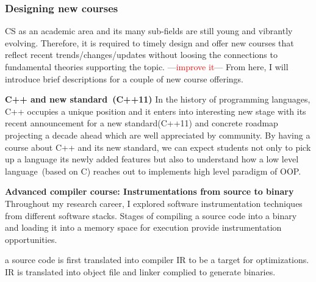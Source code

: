\documentclass[letterpaper, 10pt]{article}
\newcommand{\jikk}[1]{{---\textcolor{red}{#1}---}}
\newcommand{\jikk}[1]{}
\begin{document}
\begin{small}
\subsubsection*{Designing new courses} 

CS as an academic area and its many sub-fields are still young and vibrantly
evolving. Therefore, it is required to timely design and offer new courses that
reflect recent trends/changes/updates without loosing the connections to
fundamental theories supporting the topic. \jikk{improve it} From here, I will
introduce brief descriptions for a couple of new course offerings.
%

{\bf C++ and new standard~(C++11)} In the history of programming languages, C++
occupies a unique position and it enters into interesting new stage with its
recent announcement for a new standard(C++11) and concrete roadmap projecting a
decade ahead which are well appreciated by community.
%
%
By having a course about C++ and its new standard, we can expect students not
only to pick up a language its newly added features but also to understand how
a low level language~(based on C) reaches out to implements high level paradigm
of OOP. 

{\bf Advanced compiler course: Instrumentations from source to binary} 
Throughout my research career, I explored software instrumentation techniques
from different software stacks. 
%
Stages of compiling a source code into a binary and loading it into a memory
space for execution provide instrumentation opportunities.

a source code is first translated into compiler IR to be a target for
optimizations. IR is translated into object file and linker    complied to
generate binaries.



\end{small}
\end{document}
